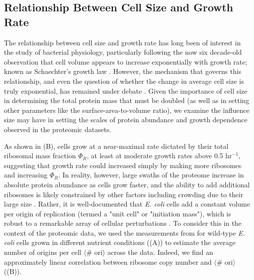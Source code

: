 
\subsection{Relationship Between Cell Size and Growth Rate}
The relationship between cell size and growth rate has long been of interest
in the study of bacterial physiology, particularly following the now six
decade-old observation that cell volume appears to increase exponentially
with growth rate; known as Schaechter's growth law \citep{schaechter1958,
taheriaraghi2015}. However, the mechanism that governs this relationship, and
even the question of whether the change in average cell size is truly
exponential, has remained under debate \citep{harris2018}. Given the
importance of cell size in determining the total protein mass that must be
doubled (as well as in setting other parameters like the
surface-area-to-volume ratio), we examine the influence size may have in
setting the scales of protein abundance and growth dependence observed in the
proteomic datasets.

As shown in (B), cells grow at a near-maximal rate
dictated by their total ribosomal mass fraction $\Phi_R$, at least at
moderate growth rates above 0.5 hr$^{-1}$, suggesting that growth rate could
increased simply by making more ribosomes and increasing $\Phi_R$. In
reality, however, large swaths of the proteome increase in absolute protein
abundance as cells grow faster, and the ability to
add additional ribosomes is likely constrained by other factors including
crowding due to their large size \citep{delarue2018, solerbistue2020}.
Rather, it is well-documented that \textit{E. coli} cells add a constant
volume per origin of replication (termed a "unit cell" or "initiation mass"),
which is robust to a remarkable array of cellular perturbations
\citep{si2017}. To consider this in the context of the proteomic data, we
used the measurements from \cite{si2017} for wild-type \textit{E. coli} cells
grown in different nutrient conditions ((A)) to
estimate the average number of origins per cell $\langle$\# ori$\rangle$
across the data. Indeed, we find an approximately linear correlation between
ribosome copy number and $\langle$\# ori$\rangle$ ((B)).

